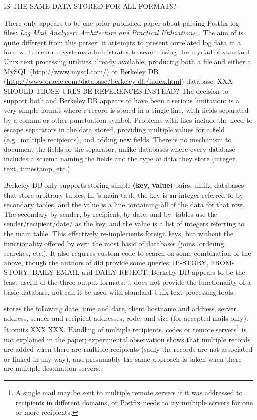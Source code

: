 IS THE SAME DATA STORED FOR ALL FORMATS\@?

\label{prior art}

There only appears to be one prior published paper about parsing Postfix
log files: \textit{Log Mail Analyzer: Architecture and Practical
Utilizations\/}~\cite{log-mail-analyser}.  The aim of \LMA{} is quite
different from this parser: it attempts to present correlated log data in a
form suitable for a systems administrator to search using the myriad of
standard Unix text processing utilities already available, producing both a
\CSV{} file and either a MySQL (\url{http://www.mysql.com/}) or Berkeley DB
(\url{http://www.oracle.com/database/berkeley-db/index.html}) database.
XXX SHOULD THOSE URLS BE REFERENCES INSTEAD\@?  The decision to support
both \CSV{} and Berkeley DB appears to have been a serious limitation:
\CSV{} is a very simple format where a record is stored in a single line,
with fields separated by a comma or other punctuation symbol.  Problems
with \CSV{} files include the need to escape separators in the data stored,
providing multiple values for a field (e.g.\ multiple recipients), and
adding new fields.  There is no mechanism to document the fields or the
separator, unlike \SQL{} databases where every database includes a schema
naming the fields and the type of data they store (integer, text,
timestamp, etc.).

Berkeley DB only supports storing simple \textbf{(key, value)} pairs,
unlike \SQL{} databases that store arbitrary tuples.  In \LMA{}'s main
table the key is an integer referred to by secondary tables, and the value
is a \CSV{} line containing all of the data for that row.  The
secondary by-sender, by-recipient, by-date, and by-\IP{} tables use the
sender/recipient/date/\IP{} as the key, and the value is a \CSV{} list of integers
referring to the main table.  This effectively re-implements
\SQL{} foreign keys, but without the functionality offered by even the most
basic of \SQL{} databases (joins, ordering, searches, etc.).  It also
requires custom code to search on some combination of the above, though the
authors of \LMA{} did provide some queries: IP-STORY, FROM-STORY,
DAILY-EMAIL and DAILY-REJECT\@.  Berkeley DB appears to be the least useful
of the three output formats: it does not provide the functionality of a
basic \SQL{} database, not can it be used with standard Unix text
processing tools.

\LMA{} stores the following date: time and date, client hostname and \IP{}
address, server \IP{} address, sender and recipient addresses, \SMTP{}
code, and size (for accepted mails only).  It omits XXX XXX\@.  Handling of
multiple recipients, \SMTP{} codes or remote servers\footnote{A single mail
may be sent to multiple remote servers if it was addressed to recipients in
different domains, or Postfix needs to try multiple servers for one or more
recipients.} is not explained in the paper; experimental observation shows
that multiple records are added when there are multiple recipients (sadly
the records are not associated or linked in any way), and presumably the
same approach is taken when there are multiple destination servers.

